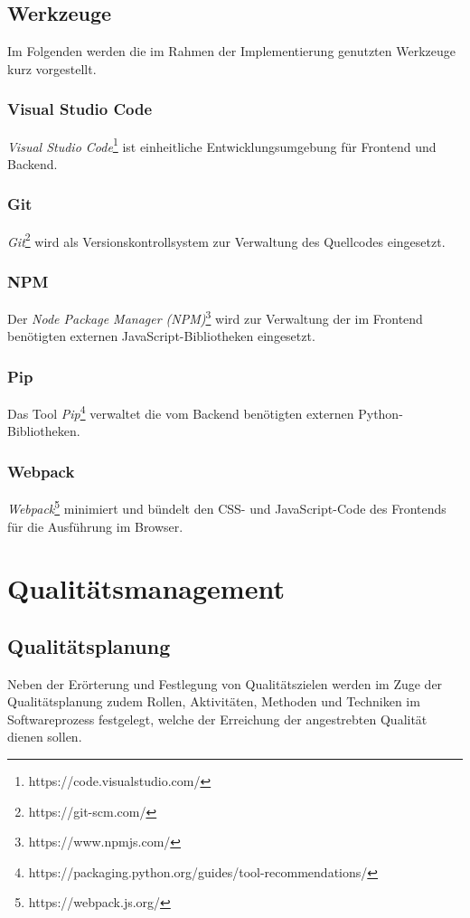 \documentclass[a4paper,11pt,listof=numbered,glossary=totoc,parskip=half,toc=bib]{scrreprt}
\begin{document}
	\section{Werkzeuge}
	Im Folgenden werden die im Rahmen der Implementierung genutzten Werkzeuge kurz vorgestellt.
	
	\subsection{Visual Studio Code}
	\textit{Visual Studio Code}\footnote{https://code.visualstudio.com/} ist einheitliche Entwicklungsumgebung für Frontend und Backend.
	
	\subsection{Git}
	\textit{Git}\footnote{https://git-scm.com/} wird als Versionskontrollsystem zur Verwaltung des Quellcodes eingesetzt.
	
	\subsection{NPM}
	Der \textit{Node Package Manager (NPM)}\footnote{https://www.npmjs.com/} wird zur Verwaltung der im Frontend benötigten externen JavaScript-Bibliotheken eingesetzt.
	
	\subsection{Pip}
	Das Tool \textit{Pip}\footnote{https://packaging.python.org/guides/tool-recommendations/} verwaltet die vom Backend benötigten externen Python-Bibliotheken.
	
	\subsection{Webpack}
	\textit{Webpack}\footnote{https://webpack.js.org/} minimiert und bündelt den CSS- und JavaScript-Code des Frontends für die Ausführung im Browser.
	

	\chapter{Qualitätsmanagement}
	
		\section{Qualitätsplanung}
	Neben der Erörterung und Festlegung von Qualitätszielen werden im Zuge der Qualitätsplanung zudem Rollen, Aktivitäten, Methoden und Techniken im Softwareprozess festgelegt, welche der Erreichung der angestrebten Qualität dienen sollen. 
	
\end{document}
